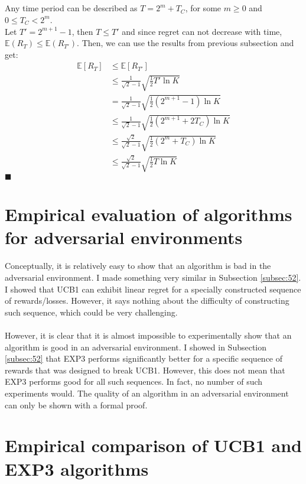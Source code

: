 \documentclass[a4paper]{article}
\newcommand{\expect}[1]{\mathbb{E}\left(#1\right)}
\newcommand*{\QEDA}{\hfill\ensuremath{\blacksquare}}%
\begin{document}
\subsection{}
\label{subsec:32}
Any time period can be described as $T = 2^m + T_C$, for some $m\geq0$ and
$0 \leq T_C < 2^m$. \\
Let $T' = 2^{m+1}-1$, then $T \leq T'$ and since regret can not decrease with time,
$\expect{R_T} \leq \expect{R_{T'}}$.
Then, we can use the results from previous subsection and get:
\begin{align*}
  \mathbb{E}\left[R_{T}\right]&\leq \mathbb{E}\left[R_{T'}\right]\\
  &\leq\frac{1}{\sqrt{2}-1} \sqrt{\frac{1}{2} T' \ln K}\\
  &= \frac{1}{\sqrt{2}-1} \sqrt{\frac{1}{2} (2^{m+1}-1) \ln K}\\
  &\leq\frac{1}{\sqrt{2}-1} \sqrt{\frac{1}{2} (2^{m+1}+2T_C) \ln K} \tag{since $T_C \geq0$}\\
  &\leq\frac{\sqrt{2}}{\sqrt{2}-1} \sqrt{\frac{1}{2} (2^m+T_C) \ln K}\\
  &\leq\frac{\sqrt{2}}{\sqrt{2}-1} \sqrt{\frac{1}{2} T \ln K}
\end{align*}
\QEDA


\section{Empirical evaluation of algorithms for adversarial environments}
\label{sec:4}
Conceptually, it is relatively easy to show that an algorithm is bad in the
adversarial environment. I made something very similar in Subsection
\ref{subsec:52}. I showed that UCB1 can exhibit linear regret for a specially
constructed sequence of rewards/losses. However, it says nothing about the
difficulty of constructing such sequence, which could be very challenging.\\\\
However, it is clear that it is almost impossible to experimentally show that an
algorithm is good in an adversarial environment. I showed in Subsection
\ref{subsec:52} that EXP3 performs significantly better for a specific
sequence of rewards that was designed to break UCB1. However, this does not
mean that EXP3 performs good for all such sequences. In fact, no number of such
experiments would. The quality of an algorithm in an adversarial environment
can only be shown with a formal proof.
  
\section{Empirical comparison of UCB1 and EXP3 algorithms}
\label{sec:5}
\end{document}
